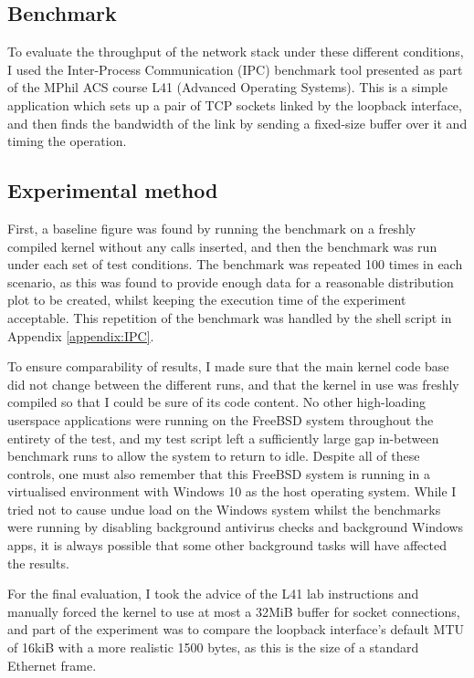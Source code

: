 \documentclass[a4paper,12pt,twoside,openright]{report}
\begin{document}
	\subsection{Benchmark}
	
	To evaluate the throughput of the network stack under these different conditions, I used the Inter-Process Communication (IPC) benchmark tool presented as part of the MPhil ACS course L41 (Advanced Operating Systems)\cite{L41}. This is a simple application which sets up a pair of TCP sockets linked by the loopback interface, and then finds the bandwidth of the link by sending a fixed-size buffer over it and timing the operation.
	
	\subsection{Experimental method}
	
	First, a baseline figure was found by running the benchmark on a freshly compiled kernel without any calls inserted, and then the benchmark was run under each set of test conditions. The benchmark was repeated 100 times in each scenario, as this was found to provide enough data for a reasonable distribution plot to be created, whilst keeping the execution time of the experiment acceptable. This repetition of the benchmark was handled by the shell script in Appendix \ref{appendix:IPC}.
	
	To ensure comparability of results, I made sure that the main kernel code base did not change between the different runs, and that the kernel in use was freshly compiled so that I could be sure of its code content. No other high-loading userspace applications were running on the FreeBSD system throughout the entirety of the test, and my test script left a sufficiently large gap in-between benchmark runs to allow the system to return to idle. Despite all of these controls, one must also remember that this FreeBSD system is running in a virtualised environment with Windows 10 as the host operating system. While I tried not to cause undue load on the Windows system whilst the benchmarks were running by disabling background antivirus checks and background Windows apps, it is always possible that some other background tasks will have affected the results.
	
	For the final evaluation, I took the advice of the L41 lab instructions and manually forced the kernel to use at most a 32MiB buffer for socket connections, and part of the experiment was to compare the loopback interface's default MTU of 16kiB with a more realistic 1500 bytes, as this is the size of a standard Ethernet frame.
	
\end{document}
